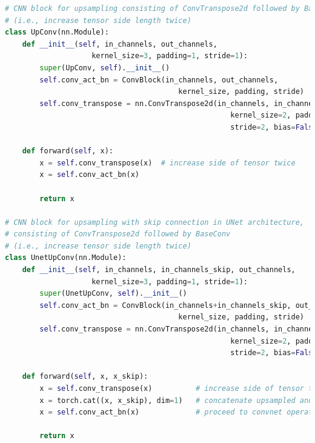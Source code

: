 \documentclass[11pt]{article}
\begin{document}
\begin{lstlisting}[language=Python, basicstyle=\scriptsize]
# CNN block for upsampling consisting of ConvTranspose2d followed by BaseConv 
# (i.e., increase tensor side length twice)
class UpConv(nn.Module):
    def __init__(self, in_channels, out_channels, 
                    kernel_size=3, padding=1, stride=1):
        super(UpConv, self).__init__()
        self.conv_act_bn = ConvBlock(in_channels, out_channels, 
                                        kernel_size, padding, stride)
        self.conv_transpose = nn.ConvTranspose2d(in_channels, in_channels, 
                                                    kernel_size=2, padding=0, 
                                                    stride=2, bias=False)
        
    def forward(self, x):
        x = self.conv_transpose(x)  # increase side of tensor twice
        x = self.conv_act_bn(x)

        return x

# CNN block for upsampling with skip connection in UNet architecture, 
# consisting of ConvTranspose2d followed by BaseConv 
# (i.e., increase tensor side length twice)
class UnetUpConv(nn.Module):
    def __init__(self, in_channels, in_channels_skip, out_channels, 
                    kernel_size=3, padding=1, stride=1):
        super(UnetUpConv, self).__init__()
        self.conv_act_bn = ConvBlock(in_channels+in_channels_skip, out_channels, 
                                        kernel_size, padding, stride)
        self.conv_transpose = nn.ConvTranspose2d(in_channels, in_channels, 
                                                    kernel_size=2, padding=0, 
                                                    stride=2, bias=False)
        
    def forward(self, x, x_skip):
        x = self.conv_transpose(x)          # increase side of tensor twice
        x = torch.cat((x, x_skip), dim=1)   # concatenate upsampled and skipped tensor
        x = self.conv_act_bn(x)             # proceed to convnet operation

        return x
\end{lstlisting}
\end{document}
